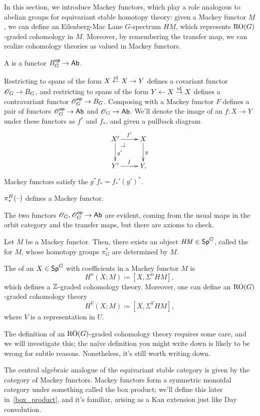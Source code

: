 In this section, we introduce Mackey functors, which play a role analogous to abelian groups for equivariant stable
homotopy theory: given a Mackey functor $\underline M$, we can define an Eilenberg-Mac Lane $G$-spectrum
$H\underline M$, which represents $\mathrm{RO}(G)$-graded cohomology in $M$. Moreover, by remembering the transfer map, we
can realize cohomology theories as valued in Mackey functors.
\begin{defn}
A  is a functor $B_G^{\mathsf{op}}\to\mathsf{Ab}$.
\end{defn}
Restricting to spans of the form $X\stackrel{\mathrm{id}}\gets X\to Y$ defines a covariant functor
$\mathscr O_G\to B_G$, and restricting to spans of the form $Y\gets X\stackrel{\mathrm{id}}\to X$ defines a contravariant functor
$\mathscr O_G^{\mathsf{op}}\to B_G$. Composing with a Mackey functor $F$ defines a pair of functors $\mathscr O_G^{\mathsf{op}}\to\mathsf{Ab}$ and
$\mathscr O_G\to\mathsf{Ab}$. We'll denote the image of an $f\colon X\to Y$ under these functors as $f^*$ and $f_*$, and given a
pullback diagram
\[\xymatrix{
	X'\ar[r]^{f'}\ar[d]^{g'}\pushoutcorner & X\ar[d]^g\\
	Y'\ar[r]^f & Y,
}\]
Mackey functors satisfy the  $g^*f_* = f_*'(g')^*$.
\begin{prop}
$\pi_*^H(\text{--})$ defines a Mackey functor.
\end{prop}
The two functors $\mathscr O_G,\mathscr O_G^{\mathsf{op}}\to\mathsf{Ab}$ are evident, coming from the usual maps in the orbit category and the
transfer maps, but there are axioms to check.

Let $M$ be a Mackey functor. Then, there exists an object $\mathit{HM}\in\mathsf{Sp}^G$, called the
 for $M$, whose homotopy groups $\pi_G^*$ are determined by $M$.
\begin{defn}
The  of an $X\in\mathsf{Sp}^G$ with coefficients in a
Mackey functor $M$ is
\[H^n(X;M)\coloneqq [X, \Sigma^n \mathit{HM}],\]
which defines a $\mathbb Z$-graded cohomology theory. Moreover, one can define an $\mathrm{RO}(G)$-graded cohomology
theory
\[H^V(X;M)\coloneqq [X, \Sigma^V \mathit{HM}],\]
where $V$ is a representation in $U$.
\end{defn}
The definition of an $\mathrm{RO}(G)$-graded cohomology theory requires some care, and we will investigate this; the naïve
definition you might write down is likely to be wrong for subtle reasons. Nonetheless, it's still worth writing
down.

The central algebraic analogue of the equivariant stable category is given by the category of Mackey functors.
Mackey functors form a symmetric monoidal category under something called the box product; we'll define this later
in~\eqref{box_product}, and it's familiar, arising as a Kan extension just like Day convolution.

